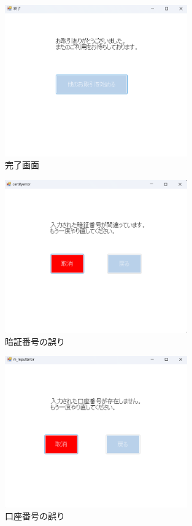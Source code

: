 \documentclass{jlreq}
\numberwithin{equation}{section}
\begin{document}
\begin{figure}[H]
  \centering
  \includegraphics[width=0.7\textwidth]{image/k_Thanks.png}
  \caption{完了画面}
  \label{fig:k_Thanks}
\end{figure}
\begin{figure}[H]
  \centering
  \includegraphics[width=0.7\textwidth]{image/l_CertifyError.png}
  \caption{暗証番号の誤り}
  \label{fig:l_CertifyError}
\end{figure}
\begin{figure}[H]
  \centering
  \includegraphics[width=0.7\textwidth]{image/m_InputError.png}
  \caption{口座番号の誤り}
  \label{fig:m_InputError}
\end{figure}
\end{document}

